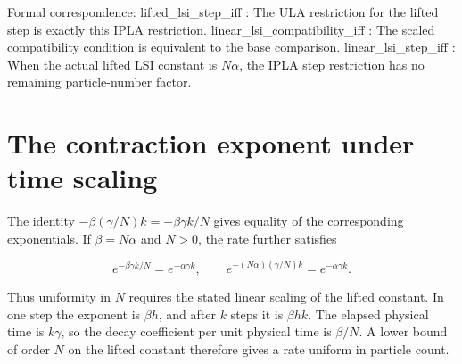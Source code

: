 \documentclass[11pt,a4paper]{article}
\begin{document}
\begin{leanbox}
Formal correspondence: lifted\_lsi\_step\_iff : The ULA restriction for the lifted step is exactly this IPLA restriction. linear\_lsi\_compatibility\_iff : The scaled compatibility condition is equivalent to the base comparison. linear\_lsi\_step\_iff : When the actual lifted LSI constant is \(N\alpha\), the IPLA step restriction has no remaining particle-number factor.
\end{leanbox}

\section{\texorpdfstring{The contraction exponent under time scaling}{The contraction exponent under time scaling}}


The identity \(-\beta(\gamma/N)k=-\beta\gamma k/N\) gives equality of the corresponding exponentials. If \(\beta=N\alpha\) and \(N>0\), the rate further satisfies

\[e^{-\beta\gamma k/N}=e^{-\alpha\gamma k},\qquad e^{-(N\alpha)(\gamma/N)k}=e^{-\alpha\gamma k}.\]

Thus uniformity in \(N\) requires the stated linear scaling of the lifted constant. In one step the exponent is \(\beta h\), and after \(k\) steps it is \(\beta hk\). The elapsed physical time is \(k\gamma\), so the decay coefficient per unit physical time is \(\beta/N\). A lower bound of order \(N\) on the lifted constant therefore gives a rate uniform in particle count.
\end{document}
